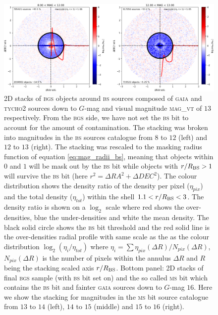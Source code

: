 \documentclass[fleqn,usenatbib]{mnras}
\newcommand{\BGS}{\textsc{bgs}\xspace}
\newcommand{\BS}{\textsc{bs}\xspace}
\newcommand{\GAIA}{\textsc{gaia}\xspace}
\newcommand{\MS}{\textsc{ms}\xspace}
\newcommand{\Tycho}{\textsc{tycho2}\xspace}
\begin{document}
\begin{figure}
	\includegraphics[width=16cm]{images/2dstack_reescaled_bs_south_nobsmask}
    \caption{2D stacks of \BGS objects around \BS sources composed of \GAIA and \Tycho sources down to $G$-mag and visual magnitude \textsc{mag}\_\textsc{vt} of $13$ respectively. From the \BGS side, we have not set the \BS bit to account for the amount of contamination. The stacking was broken into magnitudes in the \BS sources catalogue from $8$ to $12$ (left) and $12$ to $13$ (right). The stacking was rescaled to the masking radius function of equation \ref{eq:mag_radii_bs}, meaning that objects within $0$ and $1$ will be mask out by the \BS bit while objects with $r/R_{\rm BS} > 1$ will survive the \BS bit (here $r^2 = \Delta RA^2 + \Delta DEC^2$). The colour distribution shows the density ratio of the density per pixel ($\eta_{pix}$) and the total density ($\eta_{tot}$) within the shell $1.1 < r/R_{\rm BS} < 3$. The density ratio is shown on a $\log_2$ scale where red shows the over-densities, blue the under-densities and white the mean density. The black solid circle shows the \BS bit threshold and the red solid line is the over-densities radial profile with same scale as the as the colour distribution $\log_2(\eta_i/\eta_{tot})$ where $\eta_i = \sum \eta_{pix}(\Delta R)/N_{pix}(\Delta R)$, $N_{pix}(\Delta R)$ is the number of pixels within the annulus $\Delta R$ and $R$ being the stacking scaled axis $r/R_{\rm BS}$. Bottom panel: 2D stacks of final \BGS sample (with \BS bit set on) and the so called \MS bit which contains the \BS bit and fainter \GAIA sources down to $G$-mag $16$. Here we show the stacking for magnitudes in the \MS bit source catalogue from $13$ to $14$ (left), $14$ to $15$ (middle) and $15$ to $16$ (right).}
    \label{fig:2dstack_tycho_reescaled}
\end{figure}
\end{document}
